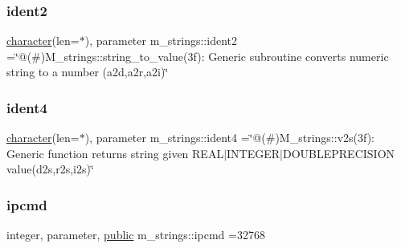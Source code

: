 \subsubsection{\texorpdfstring{ident2}{ident2}}
{\footnotesize\ttfamily \hyperlink{option__stopwatch_83_8txt_abd4b21fbbd175834027b5224bfe97e66}{character}(len=$\ast$), parameter m\+\_\+strings\+::ident2 =\char`\"{}@(\#)M\+\_\+strings\+::string\+\_\+to\+\_\+value(3f)\+: Generic subroutine converts numeric string to a number (a2d,a2r,a2i)\char`\"{}\hspace{0.3cm}{\ttfamily [private]}}

\mbox{\label{namespacem__strings_a19b07bcbc88c40854caf542d11f72cd0}} 
\subsubsection{\texorpdfstring{ident4}{ident4}}
{\footnotesize\ttfamily \hyperlink{option__stopwatch_83_8txt_abd4b21fbbd175834027b5224bfe97e66}{character}(len=$\ast$), parameter m\+\_\+strings\+::ident4 =\char`\"{}@(\#)M\+\_\+strings\+::v2s(3f)\+: Generic function returns string given R\+E\+A\+L$\vert$\+I\+N\+T\+E\+G\+E\+R$\vert$\+D\+O\+U\+B\+L\+E\+P\+R\+E\+C\+I\+S\+I\+O\+N value(d2s,r2s,i2s)\char`\"{}\hspace{0.3cm}{\ttfamily [private]}}

\mbox{\label{namespacem__strings_a40ffeae8c41d579efd77648ffc3d9a19}} 
\subsubsection{\texorpdfstring{ipcmd}{ipcmd}}
{\footnotesize\ttfamily integer, parameter, \hyperlink{M__stopwatch_83_8txt_a2f74811300c361e53b430611a7d1769f}{public} m\+\_\+strings\+::ipcmd =32768}

